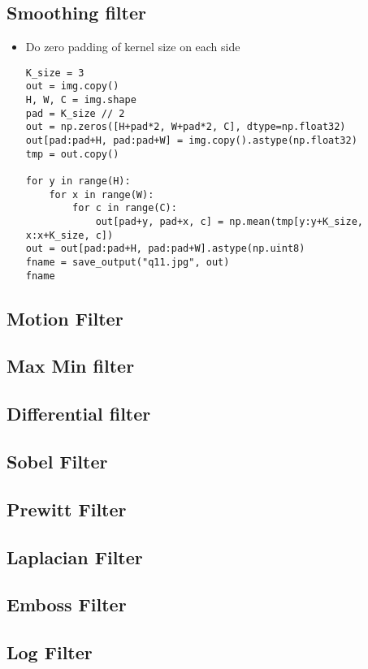 \documentclass[letterpaper, 11pt]{article}
\begin{document}
\subsection{Smoothing filter}
\label{sec:org3c6e8db}
\begin{itemize}
\item Do zero padding of kernel size on each side
\begin{verbatim}
K_size = 3
out = img.copy()
H, W, C = img.shape
pad = K_size // 2
out = np.zeros([H+pad*2, W+pad*2, C], dtype=np.float32)
out[pad:pad+H, pad:pad+W] = img.copy().astype(np.float32)
tmp = out.copy()

for y in range(H):
    for x in range(W):
        for c in range(C):
            out[pad+y, pad+x, c] = np.mean(tmp[y:y+K_size, x:x+K_size, c])
out = out[pad:pad+H, pad:pad+W].astype(np.uint8)
fname = save_output("q11.jpg", out)
fname
\end{verbatim}
\end{itemize}
\subsection{Motion Filter}
\label{sec:orge17f90c}
\subsection{Max Min filter}
\label{sec:org3243c69}
\subsection{Differential filter}
\label{sec:org4abe449}
\subsection{Sobel Filter}
\label{sec:org7145d1f}
\subsection{Prewitt Filter}
\label{sec:orgbd093e0}
\subsection{Laplacian Filter}
\label{sec:org187f1b4}
\subsection{Emboss Filter}
\label{sec:org6ae6675}
\subsection{Log Filter}
\label{sec:org68c888e}
\end{document}

